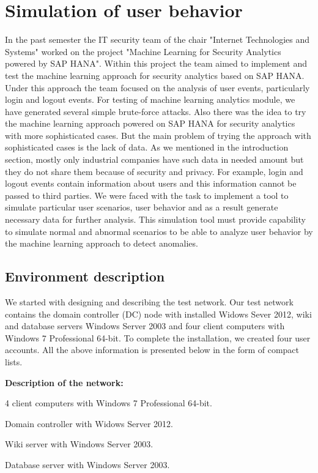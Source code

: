 \section{Simulation of user behavior}
In the past semester the IT security team of the chair "Internet Technologies and Systems" worked on the project "Machine Learning for Security Analytics powered by SAP HANA". Within this project the team aimed to implement and test the machine learning approach for security analytics based on SAP HANA. Under this approach the team focused on the analysis of user events, particularly login and logout events. For testing of machine learning analytics module, we have generated several simple brute-force attacks. Also there was the idea to try the machine learning approach powered on SAP HANA for security analytics with more sophisticated cases. But the main problem of trying the approach with sophisticated cases is the lack of data. As we mentioned in the introduction section, mostly only industrial companies have such data in needed amount but they do not share them because of security and privacy. For example, login and logout events contain information about users and this information cannot be passed to third parties. We were faced with the task to implement a tool to simulate particular user scenarios, user behavior and as a result generate necessary data for further analysis. This simulation tool must provide capability to simulate normal and abnormal scenarios to be able to analyze user behavior by the machine learning approach to detect anomalies.  
  
\subsection{Environment description}
We started with designing and describing the test network. Our test network contains the domain controller (DC) node with installed Widows Sever 2012, wiki and database servers Windows Server 2003 and four client computers with Windows 7 Professional 64-bit. To complete the installation, we created four user accounts. All the above information is presented below in the form of compact lists.

\begin{compactitem}
\item [\textbf{Description of the network:}]
\item 4 client computers with Windows 7 Professional 64-bit.
\item Domain controller with Widows Server 2012.
\item Wiki server with Windows Server 2003.
\item Database server with Windows Server 2003.
\end{compactitem}

